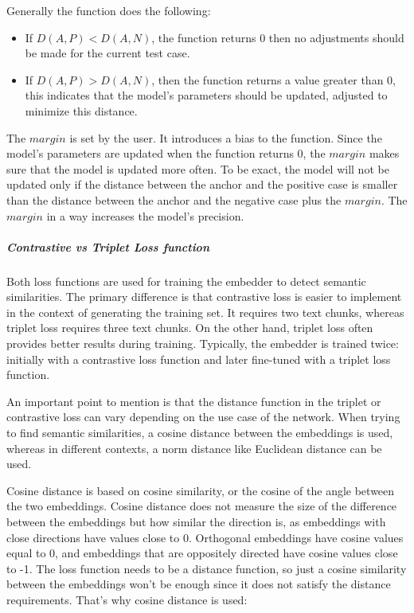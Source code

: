 \documentclass{wseas}
\begin{document}
Generally the function does the following:
\begin{itemize}
  \item If \(D(A,P) < D(A,N)\), the function returns 0 then no adjustments should be 
  made for the current test case. 
  \item If \(D(A,P) > D(A,N)\), then the function returns a value greater than 0, this
  indicates that the model's parameters should be updated, adjusted to minimize this distance. 
\end{itemize}

The \(margin\) is set by the user. It introduces a bias to the function. Since the model's parameters 
are updated when the function returns 0, the \(margin\) makes sure that the model is updated more often. 
To be exact, the model will not be updated only if the distance between the anchor and the positive case is smaller
than the distance between the anchor and the negative case plus the \(margin\). The \(margin\) in a way
increases the model's precision.


\subparagraph{Contrastive vs Triplet Loss function}

Both loss functions are used for training the embedder to detect
semantic similarities. The primary difference is that contrastive loss
is easier to implement in the context of generating the training set. It
requires two text chunks, whereas triplet loss requires three text
chunks. On the other hand, triplet loss often provides better results
during training. Typically, the embedder is trained twice: initially
with a contrastive loss function and later fine-tuned with a triplet
loss function.

An important point to mention is that the distance function in the
triplet or contrastive loss can vary depending on the use case of the
network. When trying to find semantic similarities, a cosine distance
between the embeddings is used, whereas in different contexts, a norm
distance like Euclidean distance can be used.

Cosine distance is based on cosine similarity, or the cosine of the
angle between the two embeddings. Cosine distance does not measure the
size of the difference between the embeddings but how similar the
direction is, as embeddings with close directions have values close to
0. Orthogonal embeddings have cosine values equal to 0, and embeddings
that are oppositely directed have cosine values close to -1. The loss
function needs to be a distance function, so just a cosine similarity
between the embeddings won't be enough since it does not satisfy the
distance requirements. That's why cosine distance is used:
\end{document}
